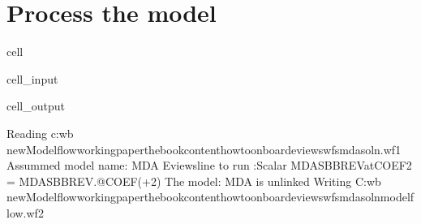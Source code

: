 \documentclass[letterpaper,10pt,english]{jupyterBook}
\begin{document}
\section{Process the model}
\label{\detokenize{content/howto/onboard/eviews/onboard one model from  wf1:process-the-model}}
\begin{sphinxuseclass}{cell}\begin{sphinxVerbatimInput}

\begin{sphinxuseclass}{cell_input}
\begin{sphinxVerbatim}[commandchars=\\\{\}]
   
                   
                        
                              
                       
                                
                                   
                          
\end{sphinxVerbatim}

\end{sphinxuseclass}\end{sphinxVerbatimInput}
\begin{sphinxVerbatimOutput}

\begin{sphinxuseclass}{cell_output}
\begin{sphinxVerbatim}[commandchars=\\\{\}]
Reading c:\PYGZbs{}wb new\PYGZbs{}Modelflow\PYGZbs{}working\PYGZus{}paper\PYGZbs{}thebook\PYGZbs{}content\PYGZbs{}howto\PYGZbs{}onboard\PYGZbs{}eviews\PYGZbs{}wfs\PYGZbs{}mdasoln.wf1
Assummed model name: MDA
Eviewsline to run :Scalar \PYGZus{}MDASBBREV\PYGZus{}at\PYGZus{}COEF\PYGZus{}2 = \PYGZus{}MDASBBREV.@COEF(+2)
The model: MDA is unlinked 
Writing C:\PYGZbs{}wb new\PYGZbs{}Modelflow\PYGZbs{}working\PYGZus{}paper\PYGZbs{}thebook\PYGZbs{}content\PYGZbs{}howto\PYGZbs{}onboard\PYGZbs{}eviews\PYGZbs{}wfs\PYGZbs{}mdasoln\PYGZus{}modelflow.wf2
\end{sphinxVerbatim}


\end{sphinxuseclass}
\end{sphinxVerbatimOutput}
\end{sphinxuseclass}
\end{document}
